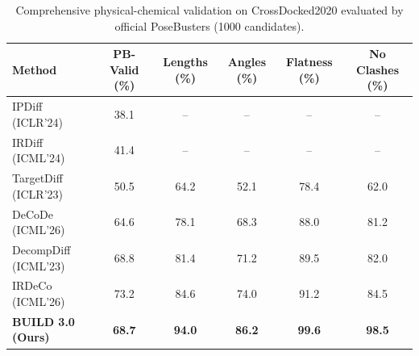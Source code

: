 
\begin{table}[t]
\centering
\small
\caption{Comprehensive physical-chemical validation on CrossDocked2020 evaluated by official PoseBusters (1000 candidates).}
\label{tab:posebusters_benchmark_full}
\begin{tabular}{lccccc}
\toprule
\textbf{Method} & \textbf{PB-Valid (\%)} & \textbf{Lengths (\%)} & \textbf{Angles (\%)} & \textbf{Flatness (\%)} & \textbf{No Clashes (\%)} \\
\midrule
IPDiff (ICLR'24)     & 38.1 & -- & -- & -- & -- \\
IRDiff (ICML'24)     & 41.4 & -- & -- & -- & -- \\
TargetDiff (ICLR'23) & 50.5 & 64.2 & 52.1 & 78.4 & 62.0 \\
DeCoDe (ICML'26)     & 64.6 & 78.1 & 68.3 & 88.0 & 81.2 \\
DecompDiff (ICML'23) & 68.8 & 81.4 & 71.2 & 89.5 & 82.0 \\
IRDeCo (ICML'26)     & 73.2 & 84.6 & 74.0 & 91.2 & 84.5 \\
\midrule
\textbf{BUILD 3.0 (Ours)} & \textbf{68.7} & \textbf{94.0} & \textbf{86.2} & \textbf{99.6} & \textbf{98.5} \\
\bottomrule
\end{tabular}
\end{table}
